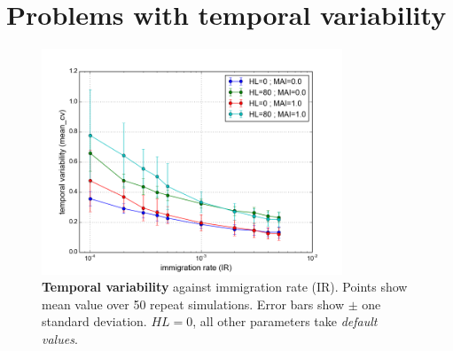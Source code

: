 %
%


\clearpage
\section{Problems with temporal variability}
\label{sec:intro_stationarity}

\begin{figure}
	\centering
	\includegraphics[width=0.8\textwidth]{"figures/stationarity/cov_vs_ir"}
	\caption{\textbf{Temporal variability} against immigration rate (IR). Points show mean value over 50 repeat simulations. Error bars show $\pm$ one standard deviation. $HL=0$, all other parameters take \emph{default values}.}
	\label{fig:cov_vs_ir}
\end{figure}

